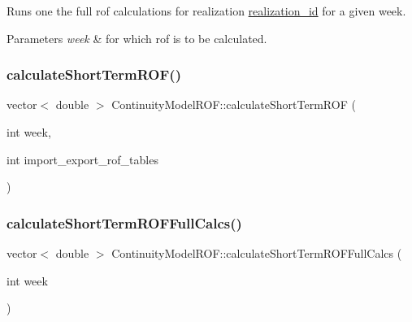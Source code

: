 Runs one the full rof calculations for realization \mbox{\hyperlink{classContinuityModel_a7b6c99bf256f6c6b633ebb78282f43c7_a7b6c99bf256f6c6b633ebb78282f43c7}{realization\+\_\+id}} for a given week. 
\begin{DoxyParams}{Parameters}
{\em week} & for which rof is to be calculated. \\
\hline
\end{DoxyParams}
\mbox{\label{classContinuityModelROF_a927597ce427aa9a9f65719bccbfba623_a927597ce427aa9a9f65719bccbfba623}} 
\subsubsection{\texorpdfstring{calculate\+Short\+Term\+R\+O\+F()}{calculateShortTermROF()}}
{\footnotesize\ttfamily vector$<$ double $>$ Continuity\+Model\+R\+O\+F\+::calculate\+Short\+Term\+R\+OF (\begin{DoxyParamCaption}\item[{int}]{week,  }\item[{int}]{import\+\_\+export\+\_\+rof\+\_\+tables }\end{DoxyParamCaption})}

\mbox{\label{classContinuityModelROF_afcf6c32935729d64dc2fdc021241c5e9_afcf6c32935729d64dc2fdc021241c5e9}} 
\subsubsection{\texorpdfstring{calculate\+Short\+Term\+R\+O\+F\+Full\+Calcs()}{calculateShortTermROFFullCalcs()}}
{\footnotesize\ttfamily vector$<$ double $>$ Continuity\+Model\+R\+O\+F\+::calculate\+Short\+Term\+R\+O\+F\+Full\+Calcs (\begin{DoxyParamCaption}\item[{int}]{week }\end{DoxyParamCaption})}

